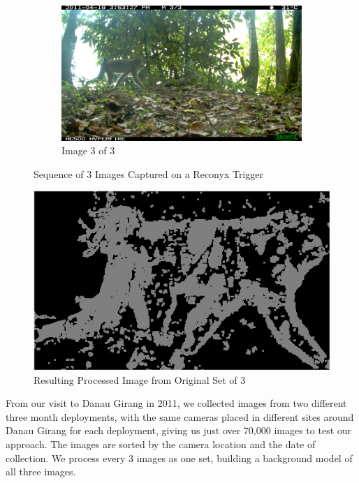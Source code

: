 \begin{figure}[ht!]
\begin{subfigure}[b]{0.5\textwidth}
  \centering
 \includegraphics[width=\textwidth]{Chap3/figures/IMG_0570}
  \caption{Image 3 of 3}
\end{subfigure}
\caption{Sequence of 3 Images Captured on a Reconyx Trigger}
\label{tech:reconyx}
\end{figure}

			\begin{figure}[h]
			\centering
			\includegraphics[width=\textwidth]{Chap3/figures/PROC_IMG_0568}
			\caption{Resulting Processed Image from Original Set of 3}
			\label{tech:reconyx:processed}
			\end{figure}
	
		From our visit to Danau Girang in 2011, we collected images from two different three month deployments, with the same cameras placed in different sites around Danau Girang for each deployment, giving us just over 70,000 images to test our approach. The images are sorted by the camera location and the date of collection. We process every 3 images as one set, building a background model of all three images.
		
